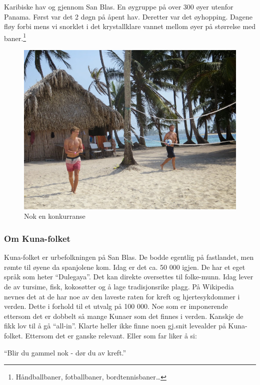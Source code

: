Karibiske hav og gjennom San Blas. En øygruppe på over 300 øyer
utenfor Panama. Først var det 2 døgn på åpent hav. Deretter var det
øyhopping. Dagene fløy forbi mens vi snorklet i det krystallklare vannet
mellom øyer på størrelse med baner.\footnote{Håndballbaner,
fotballbaner, bordtennisbaner\ldots }
\begin{figure}[H]
	\centering
	\includegraphics[width=\textwidth]{volllyduel}
	\caption*{Nok en konkurranse}
	\label{fig:volley}
\end{figure}

\subsubsection*{Om Kuna-folket}
Kuna-folket er urbefolkningen på San Blas. De bodde egentlig på
fastlandet, men rømte til øyene da spanjolene kom. Idag er det ca. 50
000 igjen. De har et eget språk som heter ``Dulegaya''. Det kan
direkte oversettes til folke-munn. Idag lever de av tursime, fisk,
kokosøtter og å lage tradisjonsrike plagg. På Wikipedia nevnes det at
de har noe av den laveste raten for kreft og hjertesykdommer i verden.
Dette i forhold til et utvalg på 100 000. Noe som er imponerende
ettersom det er dobbelt så mange Kunaer som det finnes i verden. Kanskje de
fikk lov til å gå ``all-in''. Klarte heller ikke finne noen gj.snit
levealder på Kuna- folket. Ettersom det er ganske relevant. Eller som
far liker å si:\\ 
\begin{dialogue}
	\item ``Blir du gammel nok - dør du av kreft.''
\end{dialogue}


